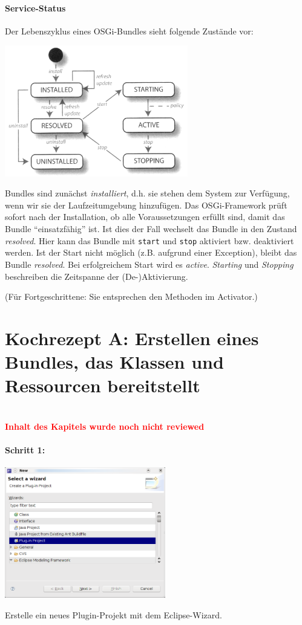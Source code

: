 \documentclass[10pt,a4paper]{scrartcl}
\newcommand{\review}[1]{
	\hfil\\
	\textbf{\textcolor{red}{#1}}
	\hfil\\
}
\begin{document}
\paragraph{Service-Status}
Der Lebenszyklus eines OSGi-Bundles sieht folgende Zustände vor:
\begin{center}
\includegraphics[width=8cm]{pics/osgilifecycle.png}
\end{center}
Bundles sind zunächst \emph{installiert}, d.h. sie stehen dem System zur Verfügung, wenn wir
sie der Laufzeitumgebung hinzufügen. Das OSGi-Framework prüft sofort nach der Installation,
ob alle Voraussetzungen erfüllt sind, damit das Bundle ``einsatzfähig'' ist. Ist dies der Fall
wechselt das Bundle in den Zustand \emph{resolved}. Hier kann das Bundle mit \texttt{start} 
und \texttt{stop} aktiviert bzw. deaktiviert werden. Ist der Start nicht möglich (z.B. aufgrund
einer Exception), bleibt das Bundle \emph{resolved}. Bei erfolgreichem Start wird es \emph{active}.
\emph{Starting} und \emph{Stopping} beschreiben die Zeitspanne der (De-)Aktivierung. 

(Für Fortgeschrittene: Sie entsprechen den Methoden im Activator.)


\clearpage
\section{Kochrezept A: Erstellen eines Bundles, das Klassen und Ressourcen bereitstellt}
\review{Inhalt des Kapitels wurde noch nicht reviewed}

\paragraph{Schritt 1:}
\begin{center}
\includegraphics[width=7cm]{pics/newbundle1.png}
\end{center}
Erstelle ein neues Plugin-Projekt mit dem Eclipse-Wizard.
\end{document}
